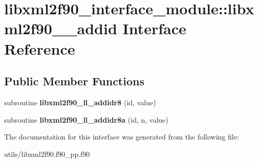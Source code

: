 \hypertarget{interfacelibxml2f90__interface__module_1_1libxml2f90____addid}{
\section{libxml2f90\_\-interface\_\-module::libxml2f90\_\-\_\-addid Interface Reference}
\label{interfacelibxml2f90__interface__module_1_1libxml2f90____addid}
}
\subsection*{Public Member Functions}
\begin{DoxyCompactItemize}
\item 
\hypertarget{interfacelibxml2f90__interface__module_1_1libxml2f90____addid_acecc86afe5b5de9df74cfb9d4baf129a}{
subroutine {\bfseries libxml2f90\_\-ll\_\-addidr8} (id, value)}
\label{interfacelibxml2f90__interface__module_1_1libxml2f90____addid_acecc86afe5b5de9df74cfb9d4baf129a}

\item 
\hypertarget{interfacelibxml2f90__interface__module_1_1libxml2f90____addid_abb6ee1f76f80fab72d6b6e6c9ed66a66}{
subroutine {\bfseries libxml2f90\_\-ll\_\-addidr8a} (id, n, value)}
\label{interfacelibxml2f90__interface__module_1_1libxml2f90____addid_abb6ee1f76f80fab72d6b6e6c9ed66a66}

\end{DoxyCompactItemize}


The documentation for this interface was generated from the following file:\begin{DoxyCompactItemize}
\item 
utils/libxml2f90.f90\_\-pp.f90\end{DoxyCompactItemize}
